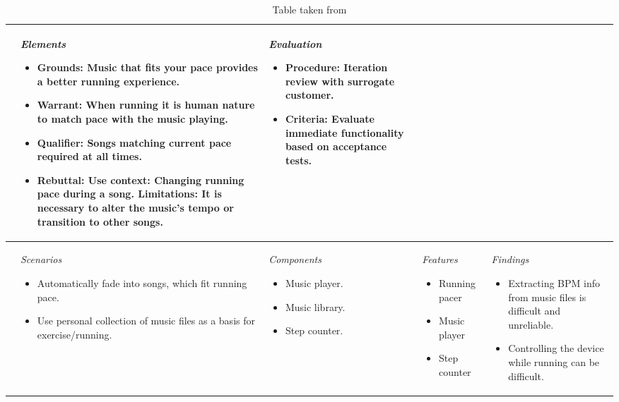 \begin{table}
\begin{tabular}{|l|l|l|l|l|}
{\begin{itemize}[leftmargin=*]
		\end{itemize}
	}
	& \parbox[t][][c]{0.20\textwidth}{
		\textit{Elements}
		\begin{itemize}[leftmargin=*] 
		\item Grounds: 
		Music that fits your pace provides a better running experience. 
		\item Warrant: 
		When running it is human nature to match pace with the music playing. 
		\item Qualifier:
		Songs matching current pace required at all times.
		\item Rebuttal: \newline
		Use context: \newline
		Changing running pace during a song. \newline 
		Limitations: 
		It is necessary to alter the music's tempo or transition to other songs.
		\end{itemize}
	}
	& \parbox[t][][c]{0.20\textwidth}{ 
		\textit{Evaluation}
		\begin{itemize}[leftmargin=*]
		\item Procedure:  Iteration review with surrogate customer.
		\item Criteria:  Evaluate immediate functionality based on acceptance tests.
		\end{itemize}		
	}\\ \hline
\parbox[t][3.5cm][c]{0.02\textwidth}{}
	& \parbox[t][][c]{0.20\textwidth}{ 
		\textit{Scenarios}
		\begin{itemize}[leftmargin=*]
		\item Automatically fade into songs, which fit running pace.
		\item Use personal collection of music files as a basis for exercise/running.
		\end{itemize}
	}
	& \parbox[t][][c]{0.20\textwidth}{ 
		\textit{Components}
		\begin{itemize}[leftmargin=*]
		\item Music player. 
		\item Music library. 
		\item Step counter.
		\end{itemize}
	}
	& \parbox[t][][c]{0.20\textwidth}{ 
		\textit{Features}
		\begin{itemize}[leftmargin=*]
		\item Running pacer
		\item Music player
		\item Step counter
		\end{itemize}
	}
	& \parbox[t][][c]{0.20\textwidth}{ 
		\textit{Findings} 
		\begin{itemize}[leftmargin=*]
		\item Extracting BPM info from music files is difficult and unreliable. 
		\item Controlling the device while running can be difficult.
		\end{itemize}
	}\\ \hline     
\end{tabular}
\caption[Table caption text]{Table taken from }
\label{table:config1}
\end{table}